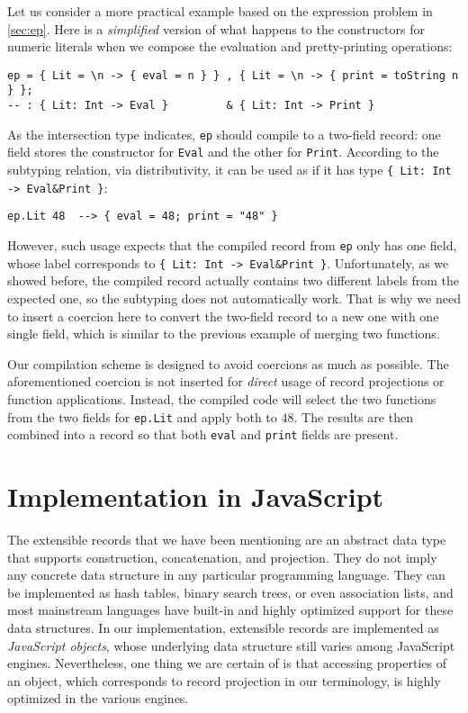 Let us consider a more practical example based on the expression problem in
\autoref{sec:ep}. Here is a \emph{simplified} version of what happens to the
constructors for numeric literals when we compose the evaluation and
pretty-printing operations:
\begin{lstlisting}
ep = { Lit = \n -> { eval = n } } , { Lit = \n -> { print = toString n } };
-- : { Lit: Int -> Eval }         & { Lit: Int -> Print }
\end{lstlisting}
As the intersection type indicates, \lstinline{ep} should compile to a two-field
record: one field stores the constructor for \lstinline{Eval} and the other for
\lstinline{Print}. According to the subtyping relation, via distributivity, it
can be used as if it has type \lstinline|{ Lit: Int -> Eval&Print }|:
\begin{lstlisting}
ep.Lit 48  --> { eval = 48; print = "48" }
\end{lstlisting}
However, such usage expects that the compiled record from \lstinline{ep} only
has one field, whose label corresponds to \lstinline|{ Lit: Int -> Eval&Print }|.
Unfortunately, as we showed before, the compiled record actually contains two
different labels from the expected one, so the subtyping does not automatically
work. That is why we need to insert a coercion here to convert the two-field
record to a new one with one single field, which is similar to the previous
example of merging two functions.

Our compilation scheme is designed to avoid coercions as much as possible. The
aforementioned coercion is not inserted for \emph{direct} usage of record
projections or function applications. Instead, the compiled code will select the
two functions from the two fields for \lstinline{ep.Lit} and apply both to 48.
The results are then combined into a record so that both \lstinline{eval} and
\lstinline{print} fields are present.

\section{Implementation in JavaScript}

The extensible records that we have been mentioning are an abstract data type
that supports construction, concatenation, and projection. They do not imply any
concrete data structure in any particular programming language. They can be
implemented as hash tables, binary search trees, or even association lists, and
most mainstream languages have built-in and highly optimized support for these
data structures. In our implementation, extensible records are implemented as
\emph{JavaScript objects}, whose underlying data structure still varies among
JavaScript engines. Nevertheless, one thing we are certain of is that accessing
properties of an object, which corresponds to record projection in our
terminology, is highly optimized in the various engines.



